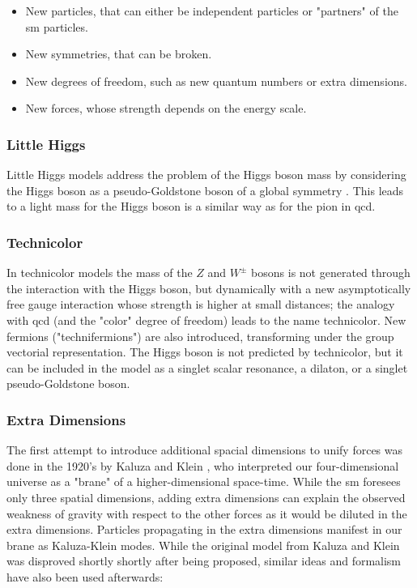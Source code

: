 \begin{itemize}
\item New particles, that can either be independent particles or "partners" of the \gls{sm} particles.
\item New symmetries, that can be broken. 
\item New degrees of freedom, such as new quantum numbers or extra dimensions.
\item New forces, whose strength depends on the energy scale.
\end{itemize}

\subsubsection*{Little Higgs}
Little Higgs models address the problem of the Higgs boson mass by considering the Higgs boson as a pseudo-Goldstone boson of a global symmetry \cite{PhysRevD.12.508, Kaplan:1983fs, KAPLAN1984187, DUGAN1985299}. This leads to a light mass for the Higgs boson is a similar way as for the pion in \gls{qcd}.

\subsubsection*{Technicolor}
In technicolor models \cite{Weinberg:1975gm, PhysRevD.20.2619} the mass of the $Z$ and $W^{\pm}$ bosons is not generated through the interaction with the Higgs boson, but dynamically with a new asymptotically free gauge interaction whose strength is higher at small distances; the analogy with \gls{qcd} (and the "color" degree of freedom) leads to the name technicolor. New fermions ("technifermions") are also introduced, transforming under the group vectorial representation. The Higgs boson is not predicted by technicolor, but it can be included in the model as a singlet scalar resonance, a dilaton, or a singlet pseudo-Goldstone boson.

\subsubsection*{Extra Dimensions}

The first attempt to introduce additional spacial dimensions to unify forces was done in the 1920's by Kaluza and Klein \cite{Kaluza, Klein:1926tv}, who interpreted our four-dimensional universe as a "brane" of a higher-dimensional space-time. While the \gls{sm} foresees only three spatial dimensions, adding extra dimensions can explain the observed weakness of gravity with respect to the other forces as it would be diluted in the extra dimensions. 
Particles propagating in the extra dimensions manifest in our brane as Kaluza-Klein modes. %
While the original model from Kaluza and Klein was disproved shortly shortly after being proposed, similar ideas and formalism have also been used afterwards:  


